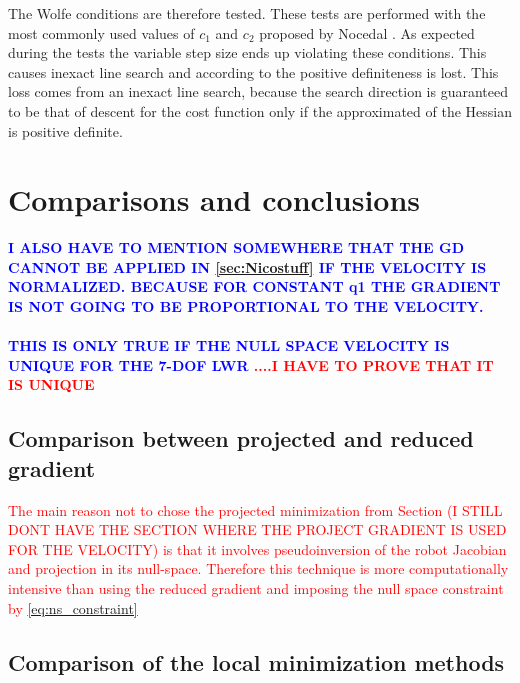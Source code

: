 The Wolfe conditions are therefore tested.  These tests are performed with the most commonly used values of $c_1$ and $c_2$ proposed by Nocedal \cite{Nocedal2006NO}.
As expected during the tests
the variable step size ends up violating these conditions. This causes inexact line search and according to \cite{intro_opt_design} the positive definiteness is lost. This loss comes from an inexact line search, because the search direction is guaranteed to be that of descent for the cost function only if the approximated of the Hessian is positive definite.

\section{Comparisons and conclusions}
\label{sec:comparison_local_minim}


\textbf{\textcolor{blue}{I ALSO HAVE TO MENTION SOMEWHERE THAT THE GD CANNOT BE APPLIED IN \ref{sec:Nicostuff} IF THE VELOCITY IS NORMALIZED. BECAUSE FOR CONSTANT  q1 THE GRADIENT IS NOT GOING TO BE PROPORTIONAL TO THE VELOCITY.} \\  \\ 
\textcolor{blue}{THIS IS ONLY TRUE IF THE NULL SPACE VELOCITY IS UNIQUE FOR THE 7-DOF LWR} \textcolor{red}{....I HAVE TO PROVE THAT IT IS UNIQUE}}


\subsection{Comparison between projected and reduced gradient}
\textcolor{red}{The main reason not to chose the projected minimization from Section (I STILL DONT HAVE THE SECTION WHERE THE PROJECT GRADIENT IS USED FOR THE VELOCITY)  is that it involves  pseudoinversion of the robot Jacobian and projection in its null-space. Therefore this technique is more computationally intensive than using the reduced gradient and imposing the null space constraint by \ref{eq:ns_constraint}}



 \subsection{Comparison of the local minimization methods}
 \label{subsec:compare_local_minim_methods}
 
